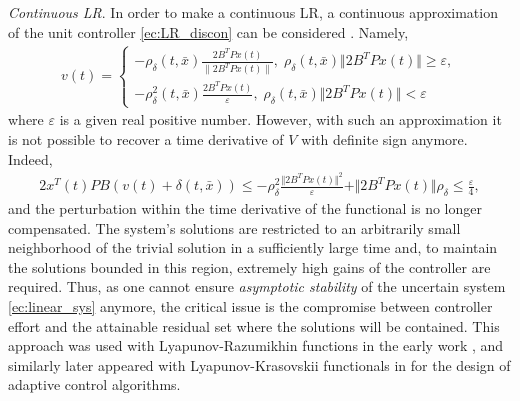 \documentclass[onecolumn]{IEEEtran}
\begin{document}
\textit{Continuous LR}. In order to make a continuous LR, a continuous approximation of the unit controller \eqref{ec:LR_discon}  can be considered \cite{Ryan1984}.   Namely,
\begin{eqnarray}\label{ec:LR_approx}
v(t)\!=\!  \left \{ \begin{matrix} -\rho_{\delta}(t,\bar x)\frac{2B^TPx(t)}{\|2B^TPx(t)\|}, \; \rho_{\delta}(t,\bar x) \Vert {2B^TPx(t)} \Vert \geq \varepsilon , \\
-\rho_{\delta}^2(t,\bar x)\frac{2B^TPx(t)}{\varepsilon},\;   \rho_{\delta}(t,\bar x) \Vert {2B^TPx(t)} \Vert < \varepsilon
\end{matrix}\right.
\end{eqnarray}
where $\varepsilon$ is a given real positive number.  However, with such an approximation it is not possible to recover a  time derivative of $V$ with definite sign anymore. Indeed,  
\begin{equation*}
\begin{split}
2x^T(t)PB(v(t)+\delta(t,\bar x))
\leq -\rho_{\delta}^2 \frac{\Vert 2B^TPx(t)\Vert^2}{\varepsilon}+\Vert 2B^{T}Px(t) \Vert \rho_{\delta}\leq \frac{\varepsilon}{4},
\end{split}
\end{equation*}
and the perturbation within the time derivative of the functional is no longer compensated. The system's solutions are restricted to an arbitrarily small neighborhood of the trivial solution in a sufficiently large time and,  to maintain the solutions bounded in this region,  extremely high gains of the controller are required. Thus,  as one cannot  ensure \textit{asymptotic stability}  of the uncertain system \eqref{ec:linear_sys} anymore, the critical issue is the compromise between controller effort and the attainable residual set where the solutions will be contained. This approach was used  with  Lyapunov-Razumikhin functions in the early work \cite{Thowsen1983}, and similarly later appeared  with  Lyapunov-Krasovskii functionals in \cite{Wu2004,Wu2009} for the design of  adaptive control algorithms.  
\end{document}
